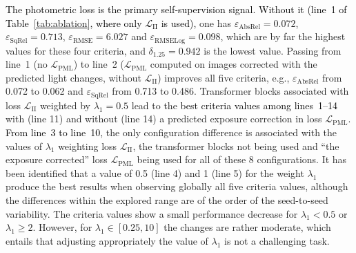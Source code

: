 \documentclass[a4paper,fleqn]{cas-dc}
\begin{document}
{ \textcolor{black}{The photometric loss is the primary self-supervision signal. Without it (line~1 of Table~\ref{tab:ablation}, where only $\mathcal{L}_\textrm{II}$ is used),} one has $\varepsilon_\textrm{AbsRel}=0.072$, $\varepsilon_\textrm{SqRel} = 0.713$, $\varepsilon_\textrm{RMSE} = 6.027$ and $\varepsilon_\textrm{RMSELog}=0.098$, which are by far the highest values for these four criteria, and $\delta_{1.25}=0.942$ is the lowest value. 
Passing from line~1 (no $\mathcal{L}_\textrm{PML}$) to line~2 ($\mathcal{L}_\textrm{PML}$ computed on images corrected with the predicted light changes, without $\mathcal{L}_\textrm{II}$) improves all five criteria, e.g., $\varepsilon_\textrm{AbsRel}$ from 0.072 to 0.062 and $\varepsilon_\textrm{SqRel}$ from 0.713 to 0.486.
\vspace*{1mm} \newline
%
 Transformer blocks associated with loss $\mathcal{L}_\textrm{II}$ weighted by $\lambda_1 = 0.5$ lead to the \textcolor{black}{best criteria values among lines~1--14} with (line 11) and without (line 14) a predicted exposure correction in loss $\mathcal{L}_\textrm{PML}$. \textcolor{black}{From line~3 to line~10}, the only configuration difference is associated with the values of $\lambda_1$ weighting loss $\mathcal{L}_\textrm{II}$, the transformer blocks not being used and ``the exposure corrected'' loss $\mathcal{L}_\textrm{PML}$ being used for all of these 8 configurations. It has been identified that a value of 0.5 (line 4) and 1 (line 5) for the weight $\lambda_1$ produce the best results when observing globally all five criteria values, although the differences within the explored range are of the order of the seed-to-seed variability. The criteria values show a small performance decrease for $\lambda_1 < 0.5$ or $\lambda_1 \ge 2$. However, for $\lambda_1 \in [0.25, 10]$ the changes are rather moderate, which entails that adjusting appropriately the value of $\lambda_1$ is not a challenging task.  
\textcolor{black}
{
}}
\end{document}
